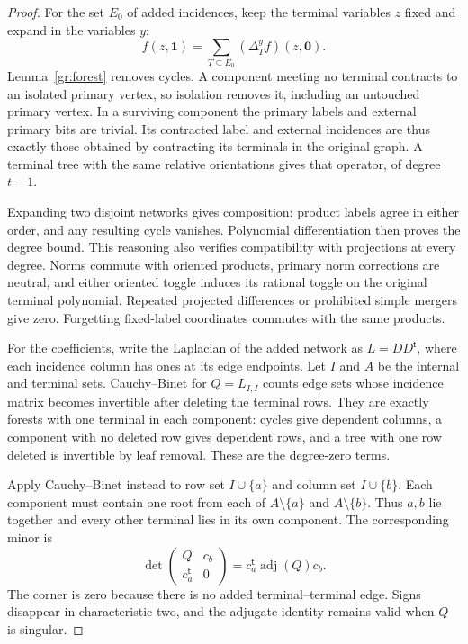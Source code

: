 \begin{proof}
For the set $E_0$ of added incidences, keep the terminal variables $z$
fixed and expand in the variables $y$:
\[
 f(z,\mathbf1)=\sum_{T\subseteq E_0}(\Delta_T^y f)(z,\mathbf0).
\]
Lemma~\ref{gr:forest} removes cycles.  A component meeting no terminal
contracts to an isolated primary vertex, so isolation removes it, including
an untouched primary vertex.  In a surviving component the primary labels
and external primary bits are trivial.  Its contracted label and external
incidences are thus exactly those obtained by contracting its terminals
in the original graph.  A terminal tree with the same relative orientations
gives that operator, of degree $t-1$.

Expanding two disjoint networks gives composition: product labels agree
in either order, and any resulting cycle vanishes.  Polynomial
differentiation then proves the degree bound.  This reasoning also verifies
compatibility with projections at every degree.  Norms commute with
oriented products, primary norm corrections are neutral, and either
oriented toggle induces its rational toggle on the original terminal
polynomial.  Repeated projected differences or prohibited simple mergers
give zero.  Forgetting fixed-label coordinates commutes with the same
products.

For the coefficients, write the Laplacian of the added network as
$L=DD^{\mathsf t}$,
where each incidence column has ones at its edge endpoints.  Let $I$ and
$A$ be the internal and terminal sets.  Cauchy--Binet for $Q=L_{I,I}$
counts edge sets whose incidence matrix becomes invertible after deleting
the terminal rows.  They are exactly forests with one terminal in each
component: cycles give dependent columns, a component with no deleted row
gives dependent rows, and a tree with one row deleted is invertible by
leaf removal.  These are the degree-zero terms.

Apply Cauchy--Binet instead to row set $I\cup\{a\}$ and column set
$I\cup\{b\}$.  Each component must contain one root from each of
$A\setminus\{a\}$ and $A\setminus\{b\}$.  Thus $a,b$ lie together
and every other terminal lies in its own component.  The corresponding
minor is
\[
 \det\begin{pmatrix}Q&c_b\\c_a^{\mathsf t}&0\end{pmatrix}
   =c_a^{\mathsf t}\operatorname{adj}(Q)c_b.
\]
The corner is zero because there is no added terminal--terminal edge.  Signs
disappear in characteristic two, and the adjugate identity remains valid
when $Q$ is singular.
\end{proof}

